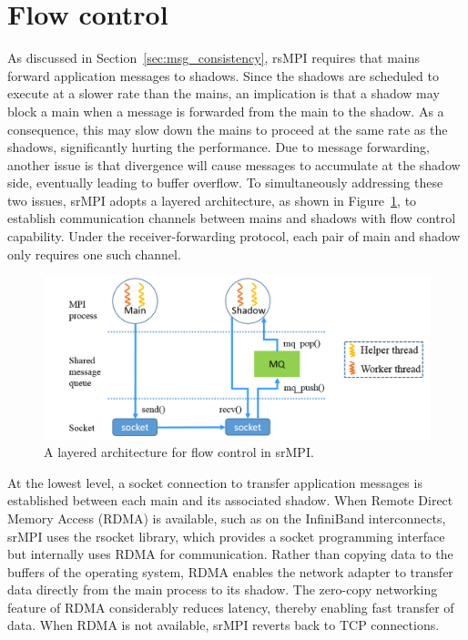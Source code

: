 \section{Flow control}
As discussed in Section~\ref{sec:msg_consistency}, rsMPI requires that mains forward application messages to shadows. Since the shadows are scheduled to execute at a slower rate than the mains, an implication is that a shadow may block a main when a message is forwarded from the main to the shadow. As a consequence, this may slow down the mains to proceed at the same rate as the shadows, significantly hurting the performance. Due to message forwarding, another issue is that divergence will cause messages to accumulate at the shadow side, eventually leading to buffer overflow. To simultaneously addressing these two issues, srMPI adopts a layered architecture, as shown in Figure~\ref{fig:flow_control}, to establish communication channels between mains and shadows with flow control capability. Under the receiver-forwarding protocol, each pair of main and shadow only requires one such channel. 

\begin{figure}[!t]
  \begin{center}
      \includegraphics[width=\columnwidth]{Figures/flow_control}
  \end{center}
  \caption{A layered architecture for flow control in srMPI.}
  \label{fig:flow_control}
\end{figure}

At the lowest level, a socket connection to transfer application messages is established between each main and its associated shadow. When Remote Direct Memory Access (RDMA) is available, such as on the InfiniBand interconnects, srMPI uses the rsocket library, which provides a socket programming interface but internally uses RDMA for communication. Rather than copying data to the buffers of the operating system, RDMA enables the network adapter to transfer data directly from the main process to its shadow. The zero-copy networking feature of RDMA considerably reduces latency, thereby enabling fast transfer of data. When RDMA is not available, srMPI reverts back to TCP connections. 


